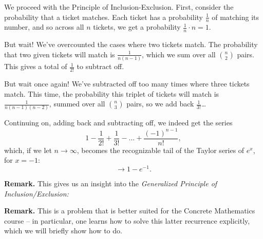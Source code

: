 \documentclass[../main.tex]{subfiles}
\begin{document}
\begin{solution}
We proceed with the Principle of Inclusion-Exclusion. 
First, consider the probability that a ticket matches. Each ticket has a probability $\frac{1}{n}$ of matching its number, and so across all $n$ tickets, we get a probability $\frac{1}{n} \cdot n = 1$. 

But wait! We've overcounted the cases where two tickets match. The probability that two given tickets will match is $\frac{1}{n(n-1)}$, which we sum over all $\binom{n}{2}$ pairs. This gives a total of $\frac{1}{2!}$ to subtract off. 

But wait once again! We've subtracted off too many times where three tickets match. This time, the probability this triplet of tickets will match is $\frac{1}{n(n-1)(n-2)}$, summed over all $\binom{n}{3}$ pairs, so we add back $\frac{1}{3!}$\ldots

Continuing on, adding back and subtracting off, we indeed get the series
\[
1 - \frac{1}{2!} + \frac{1}{3!} - \ldots + \frac{(-1)^{n-1}}{n!},
\]
which, if we let $n \to \infty$, becomes the recognizable tail of the Taylor series of $e^x$, for $x=-1$: 
\[
	\rightarrow 1 - e^{-1}.
\]

\textbf{Remark.} This gives us an insight into the \textit{Generalized Principle of Inclusion/Exclusion:}

\end{solution}

\begin{solution}[Solution to 1.3.6, Ex. 10]

\end{solution}

\textbf{Remark.} This is a problem that is better suited for the Concrete Mathematics course -- in particular, one learns how to solve this latter recurrence explicitly, which we will briefly show how to do. 
\end{document}
